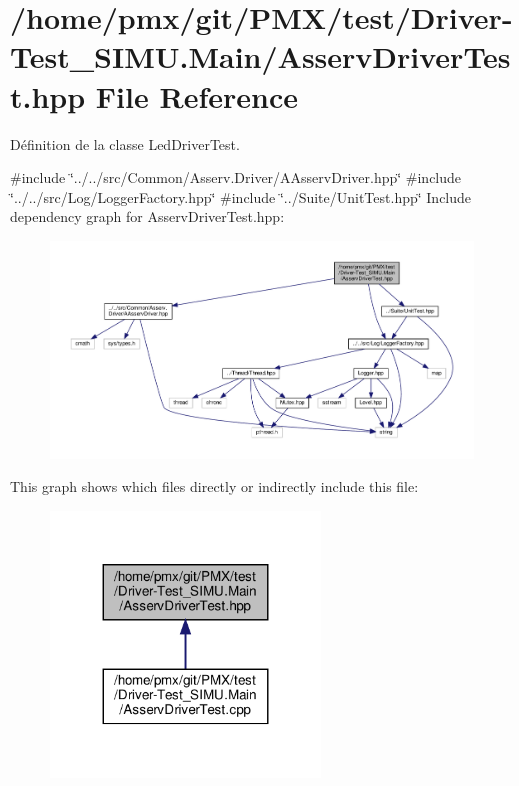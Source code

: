 \hypertarget{Driver-Test__SIMU_8Main_2AsservDriverTest_8hpp}{}\section{/home/pmx/git/\+P\+M\+X/test/\+Driver-\/\+Test\+\_\+\+S\+I\+MU.Main/\+Asserv\+Driver\+Test.hpp File Reference}
\label{Driver-Test__SIMU_8Main_2AsservDriverTest_8hpp}


Définition de la classe Led\+Driver\+Test.  


{\ttfamily \#include \char`\"{}../../src/\+Common/\+Asserv.\+Driver/\+A\+Asserv\+Driver.\+hpp\char`\"{}}\newline
{\ttfamily \#include \char`\"{}../../src/\+Log/\+Logger\+Factory.\+hpp\char`\"{}}\newline
{\ttfamily \#include \char`\"{}../\+Suite/\+Unit\+Test.\+hpp\char`\"{}}\newline
Include dependency graph for Asserv\+Driver\+Test.\+hpp\+:
\nopagebreak
\begin{figure}[H]
\begin{center}
\leavevmode
\includegraphics[width=350pt]{Driver-Test__SIMU_8Main_2AsservDriverTest_8hpp__incl}
\end{center}
\end{figure}
This graph shows which files directly or indirectly include this file\+:
\nopagebreak
\begin{figure}[H]
\begin{center}
\leavevmode
\includegraphics[width=203pt]{Driver-Test__SIMU_8Main_2AsservDriverTest_8hpp__dep__incl}
\end{center}
\end{figure}
